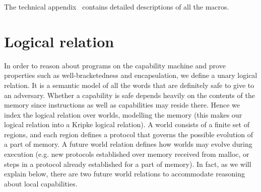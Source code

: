 \documentclass[compsoc,conference,letterpaper,fleqn]{IEEEtran}
\begin{document}
The technical appendix~\citep{technical_appendix} contains detailed descriptions
of all the macros.

\section{Logical relation}
\label{sec:logical-relation}
In order to reason about programs on the capability machine and prove properties
such as well-bracketedness and encapsulation, we define a unary logical
relation.
It is a semantic model of all the words that are definitely safe to give to an
adversary. Whether a capability is safe depends heavily on the contents of the
memory since instructions as well as capabilities may reside there. Hence we
index the logical relation over worlds, modelling the memory (this makes our
logical relation into a Kripke logical relation). A world consists of a finite
set of regions, and each region defines a protocol that governs the possible
evolution of a part of memory. A future world relation defines how worlds may
evolve during execution (e.g. new protocols established over memory received
from malloc, or steps in a protocol already established for a part of memory).
In fact, as we will explain below, there are two future world relations to
accommodate reasoning about local capabilities.
%
\end{document}

